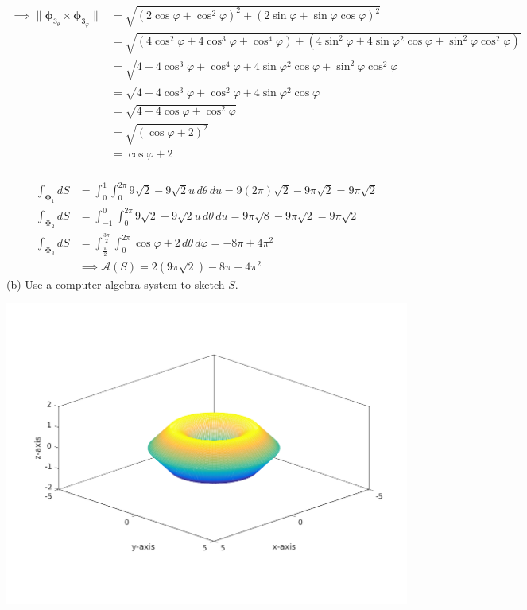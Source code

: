 \documentclass{article}
\newcommand{\norm}[1]{\| #1 \|}
\begin{document}
\begin{enumerate}
\begin{align*}
        \implies \norm {\boldsymbol \phi_{3_ \theta} \times \boldsymbol \phi_{3_ \varphi}} &= \sqrt{(2\cos \varphi  + \cos^2\varphi)^2 + (2 \sin \varphi + \sin \varphi \cos \varphi)^2} \\
        &= \sqrt{(4\cos^2 \varphi  + 4 \cos^3 \varphi + \cos^4\varphi) + (4 \sin^2 \varphi + 4\sin \varphi^2 \cos\varphi + \sin^2 \varphi \cos^2 \varphi)} \\
        &= \sqrt{4 + 4 \cos^3 \varphi + \cos^4\varphi+  4\sin \varphi^2 \cos\varphi + \sin^2 \varphi \cos^2 \varphi} \\
        &= \sqrt{4 + 4 \cos^3 \varphi + \cos^2\varphi+  4\sin \varphi^2 \cos\varphi }\\
        &= \sqrt{4 + 4 \cos \varphi + \cos^2\varphi}\\
        &= \sqrt{(\cos \varphi + 2)^2} \\
        &= \cos \varphi + 2 \\
    \end{align*}

    \begin{align*}
        \int_{\boldsymbol \Phi_1} dS &= \int_0^1\int_0^{2\pi} 9\sqrt 2  - 9 \sqrt 2  u \, d\theta \, du = 9(2\pi) \sqrt 2  - 9\pi \sqrt 2 = 9\pi \sqrt{2}\\
        \int_{\boldsymbol \Phi_2} dS &= \int_{-1}^0\int_0^{2\pi} 9\sqrt 2  + 9 \sqrt 2  u \, d\theta \, du = 9\pi \sqrt 8  - 9\pi \sqrt 2 = 9 \pi \sqrt 2 \\
        \int_{\boldsymbol \Phi_3} dS &= \int_{\frac{\pi}{2}}^{\frac{3\pi}{2}}\int_0^{2\pi} \cos \varphi + 2 \, d\theta \, d\varphi = -8\pi + 4\pi^2\\
        & \implies \mathcal{A}(S) = 2(9\pi\sqrt 2) - 8 \pi + 4 \pi^2
    \end{align*}
    (b) Use a computer algebra system to sketch $S$.

    \includegraphics[width=\textwidth,center]{b42-a8-1b}
    \newpage


\end{enumerate}
\end{document}
